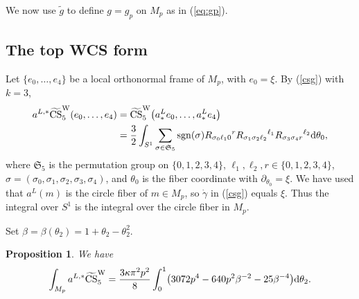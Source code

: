 \documentclass[pdftex]{sigma}
\numberwithin{equation}{section}
\newtheorem{Proposition}[Theorem]{Proposition}
\theoremstyle{definition}
\newcommand{\bxi}{\xi}
\newcommand{\sgn}{{\rm sgn}}
\newcommand{\omp}{M_p}
\newcommand{\tg}{\tilde g}
\newcommand{\barcurvature}[2]{R_{#1}{}^{#2}}
\begin{document}
We now use $\tg$ to define $g = g_p$ on $M_p$ as in (\ref{eq:gp}).

\subsection{The top WCS form}%

Let $\{e_0,\dots,e_4\}$ be a local orthonormal frame of $M_p$, with $e_0 = \bxi$.
By (\ref{csg}) with $k=3$,
\begin{align}
a^{L,*}\widetilde{{\rm CS}}^{\rm W}_5(e_0,\dots,e_4) &= \widetilde{{\rm CS}}^{\rm W}_5 \bigl(a^L_*e_0,\dots, a^L_* e_4\bigr)\nonumber\\
&=\frac{3}{2}\int_{S^1}
\sum_{\sigma \in {\mathfrak S_5}}
\sgn(\sigma) \barcurvature{\sigma_0 \ell_1 0}{r}
\barcurvature{\sigma_1 \sigma_2 \ell_2}{\ell_1}
\barcurvature{\sigma_3\sigma_4 r}{\ell_2}{\rm d}\theta_0,\label{CSThurston}
\end{align}
where $\mathfrak S_5$ is the permutation group on $\{0,1,2,3,4\}$, $\ell_1, \ell_2, r\in \{0,1,2,3,4\}$,
$\sigma=(\sigma_0, \sigma_1, \sigma_2,\allowbreak \sigma_3,\sigma_4)$, and $\theta_0$ is the fiber coordinate with $\partial_{\theta_0} = \bxi$. We have used that $a^L(m)$ is the circle fiber of $m\in \omp$, so $\dot\gamma$ in (\ref{csg}) equals $\bxi$. Thus
the integral over $S^1$ is the integral over the circle fiber in $\omp$.

Set $\beta = \beta(\theta_2) = 1+ \theta_2-\theta_2^2$.

\begin{Proposition}\label{Thurston theorem}
We have
\begin{equation}\label{thm:thurston}
\int_{\omp}
a^{L,*}\widetilde{{\rm CS}}^{\rm W}_5=
\frac{3\kappa\pi^2 p^{2}}{8}
\int_0^1\bigl(3072p^4 -640p^2\beta^{-2} -25\beta^{-4}\bigr){\rm d}\theta_2.
\end{equation}
\end{Proposition}
\end{document}
